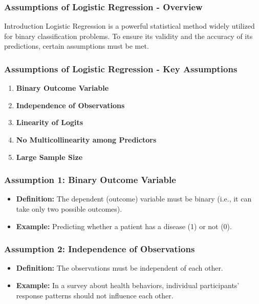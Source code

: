 \documentclass[aspectratio=169]{beamer}
\begin{document}
\begin{frame}[fragile]
    \frametitle{Assumptions of Logistic Regression - Overview}
    \begin{block}{Introduction}
        Logistic Regression is a powerful statistical method widely utilized for binary classification problems. To ensure its validity and the accuracy of its predictions, certain assumptions must be met.
    \end{block}
\end{frame}

\begin{frame}[fragile]
    \frametitle{Assumptions of Logistic Regression - Key Assumptions}
    \begin{enumerate}
        \item \textbf{Binary Outcome Variable}
        \item \textbf{Independence of Observations}
        \item \textbf{Linearity of Logits}
        \item \textbf{No Multicollinearity among Predictors}
        \item \textbf{Large Sample Size}
    \end{enumerate}
\end{frame}

\begin{frame}[fragile]
    \frametitle{Assumption 1: Binary Outcome Variable}
    \begin{itemize}
        \item \textbf{Definition:} The dependent (outcome) variable must be binary (i.e., it can take only two possible outcomes).
        \item \textbf{Example:} Predicting whether a patient has a disease (1) or not (0).
    \end{itemize}
\end{frame}

\begin{frame}[fragile]
    \frametitle{Assumption 2: Independence of Observations}
    \begin{itemize}
        \item \textbf{Definition:} The observations must be independent of each other.
        \item \textbf{Example:} In a survey about health behaviors, individual participants' response patterns should not influence each other.
    \end{itemize}
\end{frame}
\end{document}
